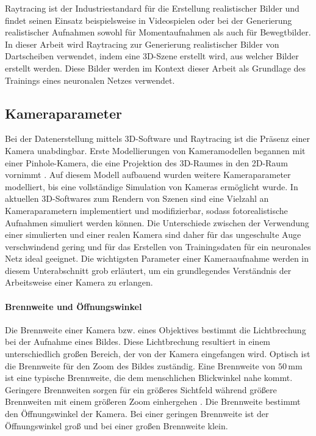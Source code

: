 Raytracing ist der Industriestandard für die Erstellung realistischer Bilder und findet seinen Einsatz beispielsweise in Videospielen oder bei der Generierung realistischer Aufnahmen sowohl für Momentaufnahmen als auch für Bewegtbilder. In dieser Arbeit wird Raytracing zur Generierung realistischer Bilder von Dartscheiben verwendet, indem eine 3D-Szene erstellt wird, aus welcher Bilder erstellt werden. Diese Bilder werden im Kontext dieser Arbeit als Grundlage des Trainings eines neuronalen Netzes verwendet.


\subsection{Kameraparameter}
\label{sec:kameras}

Bei der Datenerstellung mittels 3D-Software und Raytracing ist die Präsenz einer Kamera unabdingbar. Erste Modellierungen von Kameramodellen begannen mit einer Pinhole-Kamera, die eine Projektion des 3D-Raumes in den 2D-Raum vornimmt \cite{pinhole_camera}. Auf diesem Modell aufbauend wurden weitere Kameraparameter modelliert, bis eine vollständige Simulation von Kameras ermöglicht wurde. In aktuellen 3D-Softwares zum Rendern von Szenen sind eine Vielzahl an Kameraparametern implementiert und modifizierbar, sodass fotorealistische Aufnahmen simuliert werden können. Die Unterschiede zwischen der Verwendung einer simulierten und einer realen Kamera sind daher für das ungeschulte Auge verschwindend gering und für das Erstellen von Trainingsdaten für ein neuronales Netz ideal geeignet. Die wichtigsten Parameter einer Kameraaufnahme werden in diesem Unterabschnitt grob erläutert, um ein grundlegendes Verständnis der Arbeitsweise einer Kamera zu erlangen.

\paragraph{Brennweite und Öffnungswinkel}

Die Brennweite einer Kamera bzw. eines Objektives bestimmt die Lichtbrechung bei der Aufnahme eines Bildes. Diese Lichtbrechung resultiert in einem unterschiedlich großen Bereich, der von der Kamera eingefangen wird. Optisch ist die Brennweite für den Zoom des Bildes zuständig. Eine Brennweite von $50\,\text{mm}$ ist eine typische Brennweite, die dem menschlichen Blickwinkel nahe kommt. Geringere Brennweiten sorgen für ein größeres Sichtfeld während größere Brennweiten mit einem größeren Zoom einhergehen \cite{focal_lentgh}. Die Brennweite bestimmt den Öffnungswinkel der Kamera. Bei einer geringen Brennweite ist der Öffnungswinkel groß und bei einer großen Brennweite klein.

